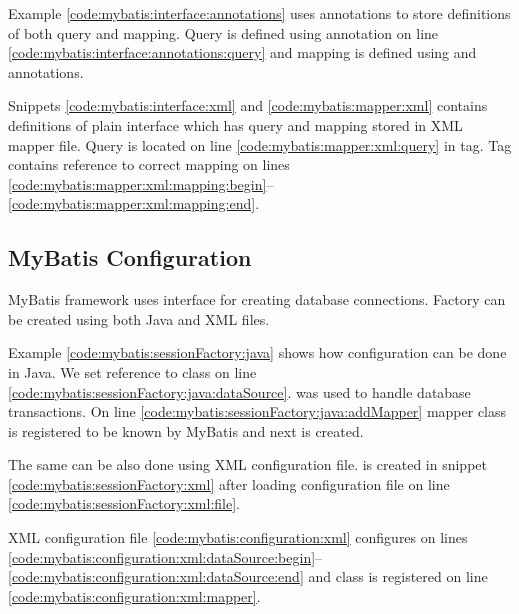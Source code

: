 
Example \ref{code:mybatis:interface:annotations} uses annotations to store definitions of both query and mapping.
Query is defined using  annotation on line \ref{code:mybatis:interface:annotations:query}
and mapping is defined using  and  annotations.


Snippets \ref{code:mybatis:interface:xml} and \ref{code:mybatis:mapper:xml} contains definitions
of plain interface which has query and mapping stored in XML mapper file.
Query is located on line \ref{code:mybatis:mapper:xml:query} in  tag.
Tag contains reference to correct  mapping on lines
\ref{code:mybatis:mapper:xml:mapping:begin}--\ref{code:mybatis:mapper:xml:mapping:end}.



\subsection{MyBatis Configuration \label{mybatis:configuration}}

MyBatis framework uses interface  for creating database connections.
Factory can be created using both Java and XML files.


Example \ref{code:mybatis:sessionFactory:java} shows how configuration can be done in Java.
We set  reference to  class on line \ref{code:mybatis:sessionFactory:java:dataSource}.
 was used to handle database transactions.
On line \ref{code:mybatis:sessionFactory:java:addMapper} mapper class is registered to be known by MyBatis
and next  is created.


The same can be also done using XML configuration file.
 is created in snippet \ref{code:mybatis:sessionFactory:xml}
after loading configuration file on line \ref{code:mybatis:sessionFactory:xml:file}.

XML configuration file \ref{code:mybatis:configuration:xml} configures  on lines
\ref{code:mybatis:configuration:xml:dataSource:begin}--\ref{code:mybatis:configuration:xml:dataSource:end}
and  class is registered on line \ref{code:mybatis:configuration:xml:mapper}.



